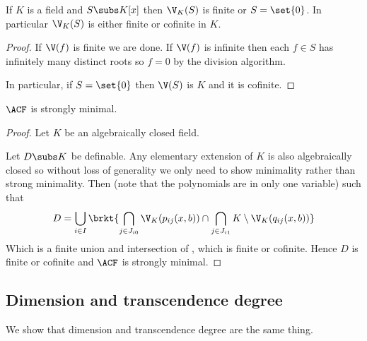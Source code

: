 \begin{lem}
    If $K$ is a field and $S \subs K[x]$
    then $\V_K(S)$ is finite or $S = \set{0}$.
    In particular $\V_K(S)$ is either finite or cofinite in $K$.
\end{lem}
\begin{proof}
    If $\V(f)$ is finite we are done.
    If $\V(f)$ is infinite
    then each $f \in S$ has infinitely many distinct roots
    so $f = 0$ by the division algorithm.
    
    In particular, if $S = \set{0}$ then $\V(S)$ is $K$ and it is cofinite.
\end{proof}

\begin{prop}
    $\ACF$ is strongly minimal.
\end{prop}
\begin{proof}
    Let $K$ be an algebraically closed field.
    
    Let $D \subs K$ be definable.
    Any elementary extension of $K$ is also algebraically closed so 
    without loss of generality we only need to show minimality rather than 
    strong minimality.
    Then  
    (note that the polynomials are in only one variable) such that 
        \[D = \bigcup_{i \in I}
        \brkt{\bigcap_{j \in J_{i0}} \V_K(p_{ij}(x,b)) \cap 
        \bigcap_{j \in J_{i1}} K \setminus \V_K(q_{ij}(x,b))}\]
    Which is a finite union and intersection of 
    ,
    which is finite or cofinite.
    Hence $D$ is finite or cofinite and $\ACF$ is strongly minimal.
\end{proof}

\subsection{Dimension and transcendence degree}
We show that dimension and transcendence degree are the same thing.

